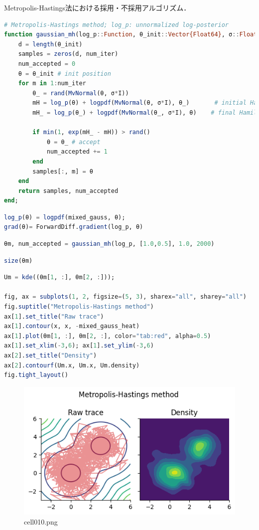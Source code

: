 Metropolis-Hastings法における採用・不採用アルゴリズム．
\begin{lstlisting}[language=julia]
# Metropolis-Hastings method; log_p: unnormalized log-posterior
function gaussian_mh(log_p::Function, θ_init::Vector{Float64}, σ::Float64, num_iter::Int)
    d = length(θ_init)
    samples = zeros(d, num_iter)
    num_accepted = 0
    θ = θ_init # init position
    for m in 1:num_iter
        θ_ = rand(MvNormal(θ, σ*I))
        mH = log_p(θ) + logpdf(MvNormal(θ, σ*I), θ_)       # initial Hamiltonian
        mH_ = log_p(θ_) + logpdf(MvNormal(θ_, σ*I), θ)    # final Hamiltonian
        
        if min(1, exp(mH_ - mH)) > rand()
            θ = θ_ # accept
            num_accepted += 1
        end
        samples[:, m] = θ
    end
    return samples, num_accepted
end;
\end{lstlisting}
\begin{lstlisting}[language=julia]
log_p(θ) = logpdf(mixed_gauss, θ);
grad(θ)= ForwardDiff.gradient(log_p, θ)
\end{lstlisting}
\begin{lstlisting}[language=julia]
θm, num_accepted = gaussian_mh(log_p, [1.0,0.5], 1.0, 2000)
\end{lstlisting}
\begin{lstlisting}[language=julia]
size(θm)
\end{lstlisting}
\begin{lstlisting}[language=julia]
Um = kde((θm[1, :], θm[2, :]));

fig, ax = subplots(1, 2, figsize=(5, 3), sharex="all", sharey="all")
fig.suptitle("Metropolis-Hastings method")
ax[1].set_title("Raw trace")
ax[1].contour(x, x, -mixed_gauss_heat)
ax[1].plot(θm[1, :], θm[2, :], color="tab:red", alpha=0.5)
ax[1].set_xlim(-3,6); ax[1].set_ylim(-3,6)
ax[2].set_title("Density")
ax[2].contourf(Um.x, Um.x, Um.density)
fig.tight_layout()
\end{lstlisting}
\begin{figure}[ht]
	\centering
	\includegraphics[scale=0.8, max width=\linewidth]{./fig/bayesian-brain/mcmc/cell010.png}
	\caption{cell010.png}
	\label{cell010.png}
\end{figure}
